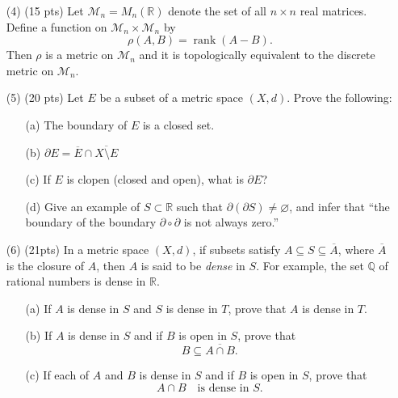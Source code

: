 \documentclass[12pt]{amsart}
\theoremstyle{definition}
\theoremstyle{remark}
\begin{document}
\begin{CJK}{UTF8}{bkai}
\begin{enumerate}
\vfill
\bigskip

\item[(4)]  (15 pts) Let $\mathcal{M}_n = M_n(\mathbb{R})$ denote the set of all $n \times n$ real matrices. Define a function on $\mathcal{M}_n \times \mathcal{M}_n$ by
\[
\rho(A,B) = \operatorname{rank}(A-B).
\]
Then $\rho$ is a metric on $\mathcal{M}_n$ and it is topologically equivalent to the discrete metric on $\mathcal{M}_n$.



\vfill
\bigskip

\item[(5)]  (20 pts)  Let $E$ be a subset of a metric space $(X,d)$. Prove the following:
\begin{enumerate}
  \item[(a)] The boundary of $E$ is a closed set.  
  \item[(b)]  $\partial E= \overline{E} \cap    \overline{X \setminus E}$ 
    \item[(c)]  If $E$ is clopen (closed and open), what is $\partial E$?
  \item[(d)] Give an example of $S \subset \mathbb{R}$ such that $\partial(\partial S) \neq \varnothing$, and infer that ``the boundary of the boundary $\partial \circ \partial$ is not always zero.''
\end{enumerate}

\bigskip

\bigskip

\item[(6)] (21pts)  In a metric space $(X,d)$, if subsets satisfy $A \subseteq S \subseteq \overline{A}$, where $\overline{A}$ is the closure of $A$, then $A$ is said to be \emph{dense} in $S$. 
For example, the set $\mathbb{Q}$ of rational numbers is dense in $\mathbb{R}$. 

\begin{enumerate}
  \item[(a)] If $A$ is dense in $S$ and $S$ is dense in $T$, prove that $A$ is dense in $T$.
  
  \item[(b)]  If $A$ is dense in $S$ and if $B$ is open in $S$, prove that
\[
B \subseteq \overline{A \cap B}.
\]
  \item[(c)]  If each of $A$ and $B$ is dense in $S$ and if $B$ is open in $S$, prove that
\[
A \cap B \quad \text{is dense in } S.
\]
\end{enumerate}


\vfill
\bigskip





\end{enumerate}



\end{CJK}
\end{document}
